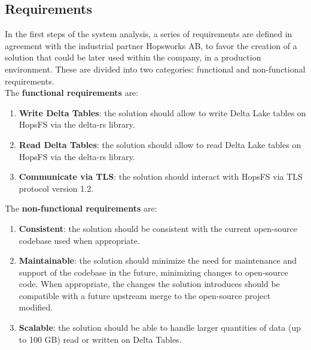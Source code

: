 \subsection{Requirements}
\label{subsec:requirements}
In the first steps of the system analysis, a series of requirements are defined in agreement with the industrial partner Hopsworks AB, to favor the creation of a solution that could be later used within the company, in a production environment. These are divided into two categories: functional and non-functional requirements. \\ The \textbf{functional requirements} are:
\begin{enumerate}
    \item \textbf{Write Delta Tables}: the solution should allow to write Delta Lake tables on \gls{HopsFS} via the delta-rs library.
    \item \textbf{Read Delta Tables}: the solution should allow to read Delta Lake tables on \gls{HopsFS} via the delta-rs library.
    \item \textbf{Communicate via TLS}: the solution should interact with \gls{HopsFS} via \gls{TLS} protocol version 1.2.
\end{enumerate}
The \textbf{non-functional requirements} are:
\begin{enumerate}
    \item \textbf{Consistent}: the solution should be consistent with the current open-source codebase used when appropriate.
    \item \textbf{Maintainable}: the solution should minimize the need for maintenance and support of the codebase in the future, minimizing changes to open-source code. When appropriate, the changes the solution introduces should be compatible with a future upstream merge to the open-source project modified.
    \item \textbf{Scalable}: the solution should be able to handle larger quantities of data (up to 100 GB) read or written on Delta Tables.
\end{enumerate}

